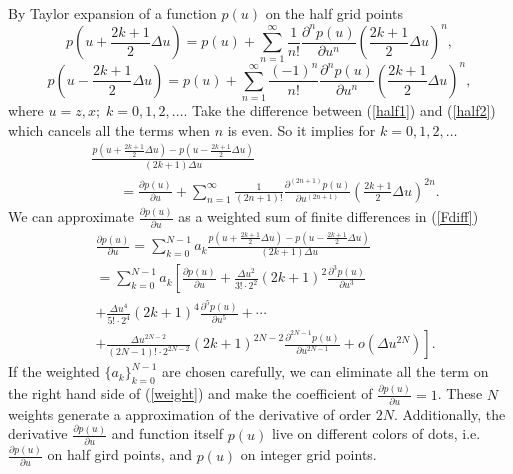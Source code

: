 \documentclass[11pt]{article}
\theoremstyle{plain}
\theoremstyle{definition}
\theoremstyle{remark}
\numberwithin{equation}{section}
\begin{document}
By Taylor expansion of a function $p(u)$ on the half grid points
  \begin{equation}\label{half1}
      p\left(u + \frac{2k+1}{2}\Delta u\right) = p(u) + \sum\limits_{n=1}^{\infty} \frac{1}{n!}\frac{\partial^n p(u)}{\partial u^n}\left(\frac{2k+1}{2}\Delta u\right)^n, 
      \end{equation}
      \begin{equation}\label{half2}
      p\left(u - \frac{2k+1}{2}\Delta u\right) = p(u) + \sum\limits_{n=1}^{\infty} \frac{(-1)^n}{n!}\frac{\partial^n p(u)}{\partial u^n}\left(\frac{2k+1}{2}\Delta u\right)^n,
  \end{equation}
where $u = z, x; \; k = 0, 1, 2, \dots $.
  Take the difference between (\ref{half1}) and (\ref{half2}) which cancels all the terms when $n$ is even.
So it implies for $k = 0, 1, 2, \dots$
\begin{equation}    \label{Fdiff}
    \begin{aligned}
   &  \frac{p\left(u + \frac{2k+1}{2}\Delta u\right) - p\left(u - \frac{2k+1}{2}\Delta u\right)}{(2k+1)\Delta u}\\
    &~~~~~~~~~  =  \frac{\partial p(u)}{\partial u} + \sum\limits_{n=1 }^{\infty} \frac{1}{(2n+1)!}\frac{\partial^{(2n+1)} p(u)}{\partial u^{(2n+1)}}\left(\frac{2k+1}{2}\Delta u\right)^{2n}.
    \end{aligned}
    \end{equation}
We can approximate $\frac{\partial p(u)}{\partial u}$ as a weighted sum of finite differences in (\ref{Fdiff})
  \begin{equation}\label{weight}
  \begin{aligned}
    &\frac{\partial p(u)}{\partial u} = \sum\limits_{k=0}^{N-1} a_k \frac{p\left(u + \frac{2k+1}{2}\Delta u\right) - p\left(u - \frac{2k+1}{2}\Delta u\right)}{(2k+1)\Delta u} \\
    &= \sum\limits_{k=0}^{N-1} a_k \left[ \frac{\partial p(u)}{\partial u} + \frac{\Delta u^2}{3! \cdot 2^2}(2k+1)^2\frac{\partial^3 p(u)}{\partial u^3} \right.\\&\left. + \frac{\Delta u^4}{5! \cdot 2^4}(2k+1)^4\frac{\partial^5 p(u)}{\partial u^5} + \cdots \right.\\&\left. + \frac{\Delta u^{2N-2}}{(2N-1)! \cdot 2^{2N-2}}(2k+1)^{2N-2}\frac{\partial^{2N-1} p(u)}{\partial u^{2N-1}} + o(\Delta u^{2N}) \right].
  \end{aligned}
  \end{equation}
If the weighted $\{ a_k\}_{k=0}^{N-1}$ are chosen carefully, we can eliminate all the term on the right hand side of (\ref{weight}) and make the coefficient of $\frac{\partial p(u)}{\partial u} =1$. These $N$ weights generate a approximation of the derivative of order $2N$. Additionally, the derivative $\frac{\partial p(u)}{\partial u}$ and function itself $p(u)$ live on different colors of dots, i.e. $\frac{\partial p(u)}{\partial u}$ on half gird points, and $p(u)$ on integer grid points.
\end{document}
